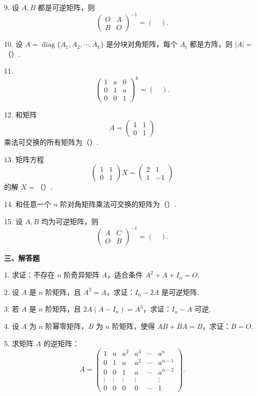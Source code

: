 \documentclass[UTF8,12pt,a4paper,fontset=fandol]{ctexart}
\begin{document}
9. 设 $A,B$ 都是可逆矩阵，则
\[
\left(
\begin{array}{cc}
O & A\\
B & O
\end{array}
\right)^{-1}
=\left(\quad\right).
\]

10. 设 $A=\operatorname{diag}\{A_1,A_2,\cdots,A_k\}$ 是分块对角矩阵，每个 $A_i$ 都是方阵，则 $|A|=$（\quad ）.

11.
\[
\left(
\begin{array}{ccc}
1 & a & 0\\
0 & 1 & a\\
0 & 0 & 1
\end{array}
\right)^k
=\left(\quad\right).
\]

12. 和矩阵
\[
A=
\left(
\begin{array}{cc}
1 & 1\\
0 & 1
\end{array}
\right)
\]
乘法可交换的所有矩阵为（\quad ）.

13. 矩阵方程
\[
\left(
\begin{array}{cc}
1 & 1\\
0 & 1
\end{array}
\right)X=
\left(
\begin{array}{rr}
2 & 1\\
1 & -1
\end{array}
\right)
\]
的解 $X=$（\quad ）.

14. 和任意一个 $n$ 阶对角矩阵乘法可交换的矩阵为（\quad ）.

15. 设 $A,B$ 均为可逆矩阵，则
\[
\left(
\begin{array}{cc}
A & C\\
O & B
\end{array}
\right)^{-1}
=\left(\quad\right).
\]

\noindent\textbf{三、解答题}

1. 求证：不存在 $n$ 阶奇异矩阵 $A$，适合条件 $A^2+A+I_n=O$.

2. 设 $A$ 是 $n$ 阶矩阵，且 $A^2=A$，求证：$I_n-2A$ 是可逆矩阵.

3. 若 $A$ 是 $n$ 阶矩阵，且 $2A(A-I_n)=A^3$，求证：$I_n-A$ 可逆.

4. 设 $A$ 为 $n$ 阶幂零矩阵，$B$ 为 $n$ 阶矩阵，使得 $AB+BA=B$，求证：$B=O$.

5. 求矩阵 $A$ 的逆矩阵：
\[
A=
\left(
\begin{array}{cccccc}
1 & a & a^2 & a^3 & \cdots & a^n\\
0 & 1 & a & a^2 & \cdots & a^{n-1}\\
0 & 0 & 1 & a & \cdots & a^{n-2}\\
\vdots & \vdots & \vdots & \vdots & & \vdots\\
0 & 0 & 0 & 0 & \cdots & 1
\end{array}
\right).
\]
\end{document}
